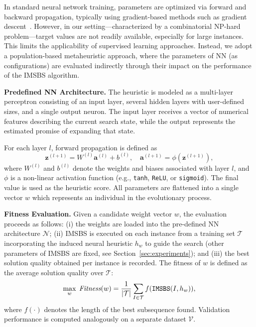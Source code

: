 \documentclass[runningheads]{llncs}
\begin{document}
In standard neural network training, parameters are optimized via forward and backward propagation, typically using gradient-based methods such as  gradient descent~\cite{amari1993backpropagation}. However, in our setting---characterized by a combinatorial \textsc{NP}-hard problem---target values are not readily available, especially for large instances. This limits the applicability of supervised learning approaches. Instead, we adopt a population-based metaheuristic approach, where the parameters of NN (as configurations) are evaluated indirectly through their impact on the performance of the IMSBS algorithm. 

\medskip
\noindent\textbf{Predefined NN Architecture.}
The heuristic is modeled as a multi-layer perceptron consisting of an input layer, several hidden layers with user-defined sizes, and a single output neuron. The input layer receives a vector of numerical features describing the current search state, while the output represents the estimated promise of expanding that state.

For each layer $l$, forward propagation is defined as
\[
\mathbf{z}^{(l+1)} = W^{(l)} \mathbf{a}^{(l)} + b^{(l)}, \quad
\mathbf{a}^{(l+1)} = \phi(\mathbf{z}^{(l+1)}),
\]
where $W^{(l)}$ and $b^{(l)}$ denote the weights and biases associated with layer $l$, and $\phi$ is a non-linear activation function (e.g., \texttt{tanh}, \texttt{ReLU}, or \texttt{sigmoid}). The final value is used as the heuristic score. All parameters are flattened into a single vector $w$ %
  which represents an individual in the evolutionary process.

\medskip
\noindent\textbf{Fitness Evaluation.}
Given a candidate weight vector $w$, the evaluation proceeds as follows: 
(i) the weights are loaded into the pre-defined NN architecture $\mathcal{N}$; 
(ii) IMSBS is executed on each instance from a training set $\mathcal{T}$ incorporating the induced neural heuristic $h_w$ to guide the search (other parameters of IMSBS are fixed, see Section~\ref{sec:experiments}); and 
(iii) the best solution quality obtained per instance is recorded. 
The fitness of $w$ is defined as the average solution quality over $\mathcal{T}$:
\begin{equation} \label{eq:training_problem_optimization}
	\max_{w} \; \emph{Fitness}(w)=\frac{1}{|\mathcal T|} \sum_{I \in \mathcal{T}} f(\texttt{IMSBS}(I, h_w)),
\end{equation}
where $f(\cdot)$ denotes the length of the best subsequence found. Validation performance is computed analogously on a separate dataset $\mathcal{V}$.
\end{document}
